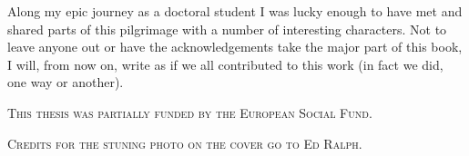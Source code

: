








\begin{acknowledgements}

Along my epic journey as a doctoral student I was lucky enough to have met and shared parts of this pilgrimage with a number of interesting characters. Not to leave anyone out or have the acknowledgements take the major part of this book, I will, from now on, write as if we all contributed to this work (in fact we did, one way or another).

\end{acknowledgements}

\vfill

\begin{center}
  \textsc{This thesis was partially funded by the European Social Fund.}

  \vspace{.2cm}

  \textsc{Credits for the stuning photo on the cover go to Ed Ralph.}
\end{center}